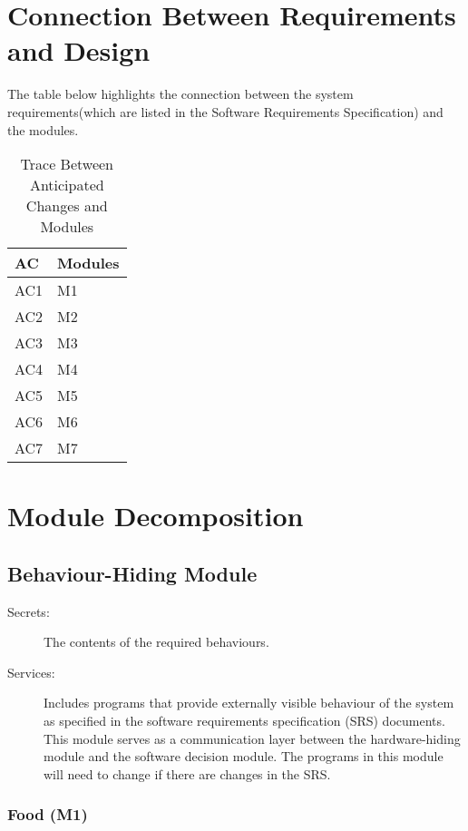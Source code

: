 \documentclass[12pt]{article}
\begin{document}
\section{Connection Between Requirements and Design} \label{SecConnection}

The table below highlights the connection between the system requirements(which are listed in the Software Requirements Specification) and the modules.

\begin{table}[H]
\centering
\begin{tabular}{p{} p{}}
\toprule
\textbf{AC} & \textbf{Modules}\\
\midrule
AC1 & M1\\
AC2 & M2\\
AC3 & M3\\
AC4 & M4\\
AC5 & M5\\
AC6 & M6\\
AC7 & M7\\
\bottomrule
\end{tabular}
\caption{Trace Between Anticipated Changes and Modules}
\end{table}

\section{Module Decomposition} \label{SecMD}


\subsection{Behaviour-Hiding Module}

\begin{description}
\item[Secrets:]The contents of the required behaviours.
\item[Services:]Includes programs that provide externally visible behaviour of
  the system as specified in the software requirements specification (SRS)
  documents. This module serves as a communication layer between the
  hardware-hiding module and the software decision module. The programs in this
  module will need to change if there are changes in the SRS.
\end{description}

\subsubsection{Food (M1)}
\end{document}
